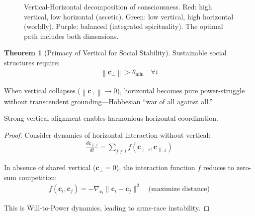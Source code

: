 \documentclass[11pt,a4paper]{article}
\theoremstyle{definition}
\newtheorem{theorem}{Theorem}[section]
\theoremstyle{remark}
\newcommand{\cc}{\mathbf{c}}
\newcommand{\norm}[1]{\left\|#1\right\|}
\begin{document}
\begin{small}
\begin{enumerate}
\begin{figure}[H]
\caption{Vertical-Horizontal decomposition of consciousness. Red: high vertical, low horizontal (ascetic). Green: low vertical, high horizontal (worldly). Purple: balanced (integrated spirituality). The optimal path includes both dimensions.}
\label{fig:vertical_horizontal}
\end{figure}

\begin{theorem}[Primacy of Vertical for Social Stability]
Sustainable social structures require:
\begin{align}
\norm{\cc_{\perp}} > \theta_{\min} \quad \forall i
\end{align}

When vertical collapses (\(\norm{\cc_{\perp}} \to 0\)), horizontal becomes pure power-struggle without transcendent grounding—Hobbesian ``war of all against all.''

Strong vertical alignment enables harmonious horizontal coordination.
\end{theorem}

\begin{proof}
Consider dynamics of horizontal interaction without vertical:
\begin{align}
\frac{d\cc_{\parallel,i}}{dt} = \sum_{j \neq i} f(\cc_{\parallel,i}, \cc_{\parallel,j})
\end{align}

In absence of shared vertical (\(\cc_{\perp} = 0\)), the interaction function \(f\) reduces to zero-sum competition:
\begin{align}
f(\cc_i, \cc_j) = -\nabla_{\cc_i} \|\cc_i - \cc_j\|^2 \quad \text{(maximize distance)}
\end{align}

This is Will-to-Power dynamics, leading to arms-race instability.


\end{proof}
\end{enumerate}
\end{small}
\end{document}
